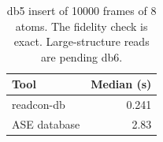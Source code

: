 \begin{table}[tbp]
\centering
\scriptsize
\caption{db5 insert of 10000 frames of 8 atoms.
The fidelity check is exact.
Large-structure reads are pending db6.}
\label{tab:db5}
\begin{tabular}{@{}lr@{}}
\toprule
Tool & Median (s) \\
\midrule
readcon-db & 0.241 \\
ASE database & 2.83 \\
\bottomrule
\end{tabular}
\end{table}
